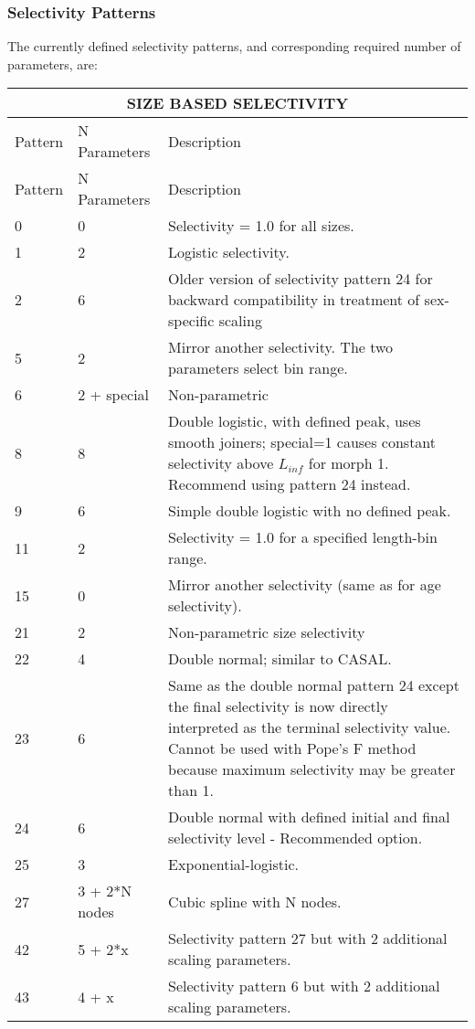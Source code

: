 \hypertarget{SelexPattern}{}
\subsubsection{Selectivity Patterns}
The currently defined selectivity patterns, and corresponding required number of parameters, are:


\begin{longtable}{p{2cm} p{3cm} p{10cm}}
	\multicolumn{3}{c}{SIZE BASED SELECTIVITY} \Bstrut\\	
	\endfirsthead

	\hline
	Pattern & N Parameters & Description \Tstrut\Bstrut\\
	\hline
	\endhead

	\hline
	\endfoot
	\endlastfoot

	\hline
		
	Pattern & N Parameters & Description \Tstrut\Bstrut\\
	\hline
	0 \Tstrut& 0 & Selectivity = 1.0 for all sizes. \\
	1 \Tstrut& 2 & Logistic selectivity. \\
	2 \Tstrut& 6 & Older version of selectivity pattern 24 for backward compatibility in treatment of sex-specific scaling \\
	5 \Tstrut& 2 & Mirror another selectivity. The two parameters select bin range. \\
	6 \Tstrut& 2 + special & Non-parametric \\
	8 \Tstrut& 8 & Double logistic, with defined peak, uses smooth joiners; special=1 causes constant selectivity above $L_{inf}$ for morph 1. Recommend using pattern 24 instead. \\
	9 \Tstrut& 6 & Simple double logistic with no defined peak. \\
	11 \Tstrut& 2 & Selectivity = 1.0 for a specified length-bin range. \\
	15 \Tstrut& 0 & Mirror another selectivity (same as for age selectivity). \\
	21 \Tstrut& 2 & Non-parametric size selectivity \\
	22 \Tstrut& 4 & Double normal; similar to CASAL. \\
	23 \Tstrut& 6 & Same as the double normal pattern 24 except the final selectivity is now directly interpreted as the terminal selectivity value. Cannot be used with Pope's F method because maximum selectivity may be greater than 1. \\
	24 \Tstrut& 6 & Double normal with defined initial and final selectivity level - Recommended option. \\
	25 \Tstrut& 3 & Exponential-logistic. \\
	27 \Tstrut& 3 + 2*N nodes & Cubic spline with N nodes. \\
	42 \Tstrut& 5 + 2*x & Selectivity pattern 27 but with 2 additional scaling parameters. \\
	43 \Tstrut& 4 + x & Selectivity pattern 6 but with 2 additional scaling parameters. \Bstrut\\
	\hline
\end{longtable}


